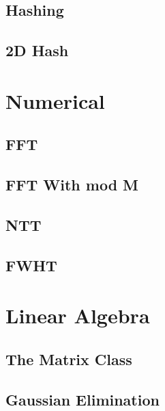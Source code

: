 \section{Hashing}


\section{2D Hash}


\chapter{Numerical}
\section{FFT}


\section{FFT With mod M}


\section{NTT}


\section{FWHT}


\chapter{Linear Algebra}
\section{The Matrix Class}


\section{Gaussian Elimination}


